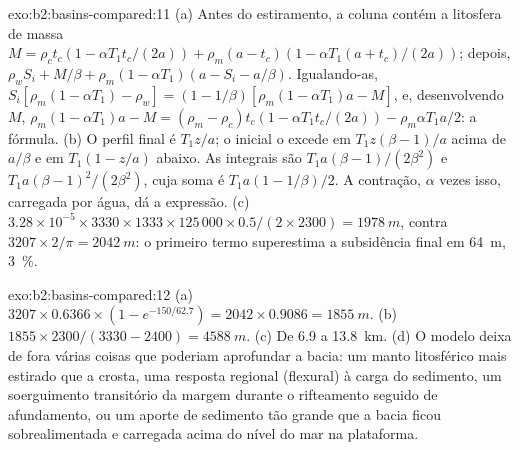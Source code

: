 \begin{solution}{exo:b2:basins-compared:11}
(a) Antes do estiramento, a coluna contém a litosfera de massa $M = \rho_c t_c(1 - \alpha T_1
t_c/(2a)) + \rho_m(a - t_c)(1 - \alpha T_1(a + t_c)/(2a))$; depois, $\rho_w S_i + M/\beta +
\rho_m(1 - \alpha T_1)(a - S_i - a/\beta)$. Igualando-as, $S_i[\rho_m(1 - \alpha T_1) - \rho_w] =
(1 - 1/\beta)[\rho_m(1 - \alpha T_1)a - M]$, e, desenvolvendo $M$, $\rho_m(1 - \alpha T_1)a - M =
(\rho_m - \rho_c)t_c(1 - \alpha T_1 t_c/(2a)) - \rho_m\alpha T_1 a/2$: a fórmula. (b) O perfil final é $T_1 z/a$; o inicial o excede
em $T_1 z(\beta - 1)/a$ acima de $a/\beta$ e em $T_1(1 - z/a)$ abaixo. As integrais são $T_1
a(\beta - 1)/(2\beta^2)$ e $T_1 a(\beta - 1)^2/(2\beta^2)$, cuja soma é $T_1 a(1 - 1/\beta)/2$.
A contração, $\alpha$ vezes isso, carregada por água, dá a expressão. (c) $3.28\times10^{-5}
\times3330\times1333\times125\,000\times0.5/(2\times2300) = \qty{1978}{m}$, contra $3207\times
2/\pi = \qty{2042}{m}$: o primeiro termo superestima a subsidência final em \qty{64}{m},
\qty{3}{\percent}.
\end{solution}

\begin{solution}{exo:b2:basins-compared:12}
(a) $3207\times0.6366\times(1 - e^{-150/62.7}) = 2042\times0.9086 = \qty{1855}{m}$. (b) $1855\times
2300/(3330 - 2400) = \qty{4588}{m}$. (c) De 6.9 a \qty{13.8}{km}. (d) O modelo deixa de fora várias
coisas que poderiam aprofundar a bacia: um manto litosférico mais estirado que a crosta, uma resposta regional
(flexural) à carga do sedimento, um soerguimento transitório da margem durante o rifteamento
seguido de afundamento, ou um aporte de sedimento tão grande que a bacia ficou sobrealimentada e carregada
acima do nível do mar na plataforma.
\end{solution}

